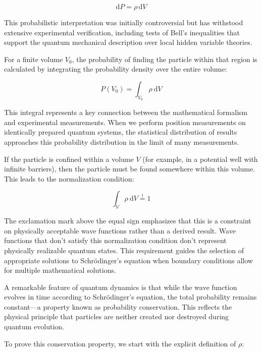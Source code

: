 \documentclass[italian]{HKNdocument}
\begin{document}
\begin{equation*}
\mathrm{d}P=\rho\,\mathrm{d}V \tag{1.24}
\end{equation*}

This probabilistic interpretation was initially controversial but has withstood extensive experimental verification, including tests of Bell's inequalities that support the quantum mechanical description over local hidden variable theories.

For a finite volume $V_{0}$, the probability of finding the particle within that region is calculated by integrating the probability density over the entire volume:

\begin{equation*}
P\left(V_{0}\right)=\int_{V_{0}} \rho \mathrm{~d} V \tag{1.25}
\end{equation*}

This integral represents a key connection between the mathematical formalism and experimental measurements. When we perform position measurements on identically prepared quantum systems, the statistical distribution of results approaches this probability distribution in the limit of many measurements.

If the particle is confined within a volume $V$ (for example, in a potential well with infinite barriers), then the particle must be found somewhere within this volume. This leads to the normalization condition:

\begin{equation*}
\int_{V} \rho \mathrm{~d} V \stackrel{!}{=} 1 \tag{1.26}
\end{equation*}

The exclamation mark above the equal sign emphasizes that this is a constraint on physically acceptable wave functions rather than a derived result. Wave functions that don't satisfy this normalization condition don't represent physically realizable quantum states. This requirement guides the selection of appropriate solutions to Schrödinger's equation when boundary conditions allow for multiple mathematical solutions.

A remarkable feature of quantum dynamics is that while the wave function evolves in time according to Schrödinger's equation, the total probability remains constant—a property known as probability conservation. This reflects the physical principle that particles are neither created nor destroyed during quantum evolution.

To prove this conservation property, we start with the explicit definition of $\rho$:
\end{document}
